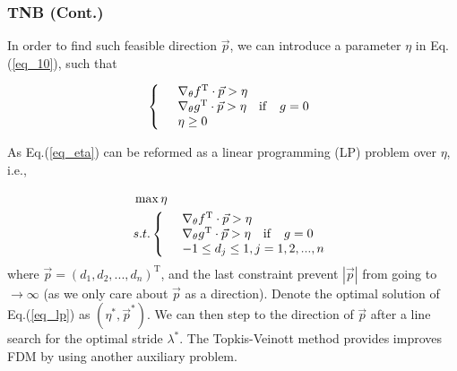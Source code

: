\documentclass[10pt,hyperref={CJKbookmarks=true},envcountsect,mathserif]{beamer}
\begin{document}
\begin{frame}
	\frametitle{TNB (Cont.)}
	In order to find such feasible direction $\vec{p}$, we can introduce a parameter $\eta$ in Eq.({\ref{eq_10}}), such that

\begin{equation}
\label{eq_eta}
\left\{\begin{array}{ll}
&\nabla_{\theta}f^{\rm{T}} \cdot \vec{p} >\eta  \\
&\nabla_{\theta}g^{\rm{T}} \cdot \vec{p} >\eta \quad \mathrm{if}  \quad g = 0 \\
& \eta \ge 0
\end{array}\right.
\end{equation}

As Eq.(\ref{eq_eta}) can be reformed as a linear programming (LP) problem over $\eta$, i.e.,

\begin{equation}
\label{eq_lp}
\begin{split}
&\max \eta \\
& s.t.\left\{\begin{array}{ll}
&\nabla_{\theta}f^{\rm{T}} \cdot \vec{p} >\eta  \\
&\nabla_{\theta}g^{\rm{T}} \cdot \vec{p} >\eta \quad \mathrm{if}  \quad g = 0 \\
& -1\le d_j \le 1, j=1,2,...,n
\end{array}\right.
\end{split}
\end{equation}
where $\vec{p} = (d_1,d_2,...,d_n)^\mathrm{T}$, and the last constraint prevent $|\vec{p}|$ from going to $\rightarrow \infty$ (as we only care about $\vec{p}$ as a direction). Denote the optimal solution of Eq.(\ref{eq_lp}) as $(\eta^*,\vec{p}^*)$. We can then step to the direction of $\vec{p}$ after a line search for the optimal stride $\lambda^*$. The Topkis-Veinott method provides improves FDM by using another auxiliary problem.

\end{frame}
\end{document}
